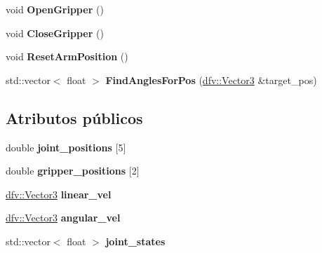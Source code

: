 \begin{DoxyCompactItemize}
\item 
\hypertarget{classdfv_1_1Youbot_a6eec4021fd747e169b0cd793ecf0a21d}{void {\bfseries \-Open\-Gripper} ()}\label{classdfv_1_1Youbot_a6eec4021fd747e169b0cd793ecf0a21d}

\item 
\hypertarget{classdfv_1_1Youbot_a83eb89c33c05f1f0b0043674fd1b4561}{void {\bfseries \-Close\-Gripper} ()}\label{classdfv_1_1Youbot_a83eb89c33c05f1f0b0043674fd1b4561}

\item 
\hypertarget{classdfv_1_1Youbot_a2a2bedf8adcb1b34147f8122a0fc77a1}{void {\bfseries \-Reset\-Arm\-Position} ()}\label{classdfv_1_1Youbot_a2a2bedf8adcb1b34147f8122a0fc77a1}

\item 
\hypertarget{classdfv_1_1Youbot_a9e0c49ce6cd3d275d16cdafcd6c203d9}{std\-::vector$<$ float $>$ {\bfseries \-Find\-Angles\-For\-Pos} (\hyperlink{classdfv_1_1Vector3}{dfv\-::\-Vector3} \&target\-\_\-pos)}\label{classdfv_1_1Youbot_a9e0c49ce6cd3d275d16cdafcd6c203d9}

\end{DoxyCompactItemize}
\subsection*{\-Atributos públicos}
\begin{DoxyCompactItemize}
\item 
\hypertarget{classdfv_1_1Youbot_af286b747f6864610fb1d365687fa58cd}{double {\bfseries joint\-\_\-positions} \mbox{[}5\mbox{]}}\label{classdfv_1_1Youbot_af286b747f6864610fb1d365687fa58cd}

\item 
\hypertarget{classdfv_1_1Youbot_a37753d53f3b44950721a334f2291f66b}{double {\bfseries gripper\-\_\-positions} \mbox{[}2\mbox{]}}\label{classdfv_1_1Youbot_a37753d53f3b44950721a334f2291f66b}

\item 
\hypertarget{classdfv_1_1Youbot_a75f2e0846f6f2258076c789f8321593a}{\hyperlink{classdfv_1_1Vector3}{dfv\-::\-Vector3} {\bfseries linear\-\_\-vel}}\label{classdfv_1_1Youbot_a75f2e0846f6f2258076c789f8321593a}

\item 
\hypertarget{classdfv_1_1Youbot_a636caf4b690b2ee5d90895c77b156b28}{\hyperlink{classdfv_1_1Vector3}{dfv\-::\-Vector3} {\bfseries angular\-\_\-vel}}\label{classdfv_1_1Youbot_a636caf4b690b2ee5d90895c77b156b28}

\item 
\hypertarget{classdfv_1_1Youbot_a6b2fe1930c1defa4d9c8e5b188d7070f}{std\-::vector$<$ float $>$ {\bfseries joint\-\_\-states}}\label{classdfv_1_1Youbot_a6b2fe1930c1defa4d9c8e5b188d7070f}

\end{DoxyCompactItemize}
